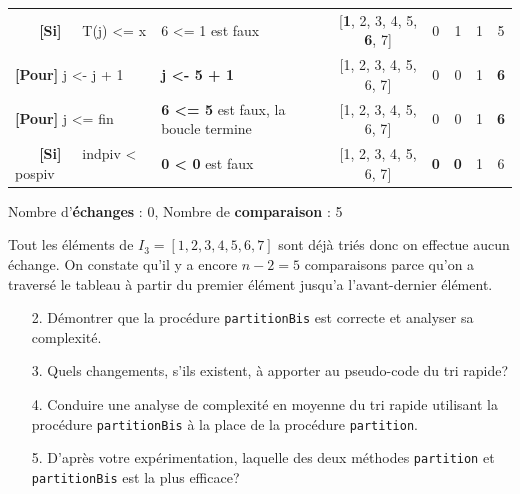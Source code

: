 \documentclass[10pt]{article} %
\newcommand{\asgold}[1]{\textcolor{mygold}{{\bf#1}}}
\newcommand{\asred}[1]{\textcolor{red}{{\bf#1}}}
\newcommand{\asgr}[1]{\textcolor{mygreen}{{\bf#1}}}
\newcommand{\aspurp}[1]{\textcolor{mypurp}{{\bf#1}}}
\begin{document}
\begin{table}[h!]
\begin{tabular}{ll|ccccc}
    \asgr{\ \ \ [Si]\ \ } T(j) \textless{}= x       & \cellcolor{mypurp} 6 \textless{}= 1 est faux                                     & {[}\aspurp{1}, 2, 3, 4, 5, \aspurp{6}, 7{]} & 0      & 1      & 1& 5 \\
    \asgr{[Pour]} j \textless{}- j + 1  &  \asgold{j \textless{}- 5 + 1}                                                              & {[}1, 2, 3, 4, 5, 6, 7{]} & 0      & 0      & 1& \asgold{6} \\
    \asgr{[Pour]} j \textless{}= fin      & \aspurp{6 \textless{}= 5} est faux, la boucle termine                   & {[}1, 2, 3, 4, 5, 6, 7{]} & 0      & 0      & 1 & \aspurp{6} \\
    \asgr{\ \ \ [Si]\ \ } indpiv \textless{} pospiv   & \aspurp{0 \textless{} 0} est faux &  {[}1, 2, 3, 4, 5, 6, 7{]} & \aspurp{0}      & \aspurp{0}      & 1 & 6 \\
    \hline
    \end{tabular}
    \end{table}

\vspace{-.4cm}
\noindent Nombre d'\asgold{échanges} : 0, Nombre de \aspurp{comparaison} : 5
\newpage

Tout les éléments de $I_3 = [1, 2, 3, 4, 5, 6, 7]$ sont déjà triés donc on effectue aucun échange. On constate qu'il y a encore $n - 2 = 5$ comparaisons parce qu'on a
traversé le tableau à partir du premier élément jusqu'a l'avant-dernier élément.


\begin{itemize}
    \item[2.] Démontrer que la procédure \texttt{partitionBis} est correcte et analyser sa complexité.
\end{itemize}

\begin{itemize}
    \item[3.] Quels changements, s'ils existent, à apporter au pseudo-code du tri rapide?
\end{itemize}

\begin{itemize}
    \item[4.] Conduire une analyse de complexité en moyenne du tri rapide utilisant la procédure \texttt{partitionBis} à la
    place de la procédure \texttt{partition}.
\end{itemize}

\begin{itemize}
    \item[5.] D'après votre expérimentation, laquelle des deux méthodes \texttt{partition} et \texttt{partitionBis} est la
    plus efficace?
\end{itemize}
\end{document}
